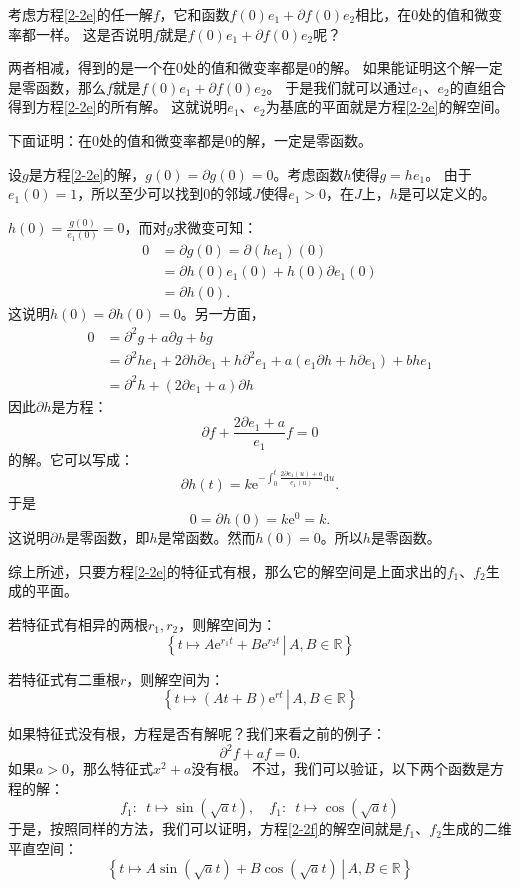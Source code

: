 \documentclass[12pt,UTF8]{ctexbook}
\newcommand{\e}{\mathrm{e}}
\theoremstyle{definition}
\theoremstyle{plain}
\begin{document}
考虑方程\eqref{2-2e}的任一解$f$，它和函数$f(0)e_1 + \partial f(0) e_2$相比，在$0$处的值和微变率都一样。
这是否说明$f$就是$f(0)e_1 + \partial f(0) e_2$呢？

两者相减，得到的是一个在$0$处的值和微变率都是$0$的解。
如果能证明这个解一定是零函数，那么$f$就是$f(0)e_1 + \partial f(0) e_2$。
于是我们就可以通过$e_1$、$e_2$的直组合得到方程\eqref{2-2e}的所有解。
这就说明$e_1$、$e_2$为基底的平面就是方程\eqref{2-2e}的解空间。

下面证明：在$0$处的值和微变率都是$0$的解，一定是零函数。

设$g$是方程\eqref{2-2e}的解，$g(0) = \partial g(0) = 0$。考虑函数$h$使得$g = he_1$。
由于$e_1(0) = 1$，所以至少可以找到$0$的邻域$J$使得$e_1 > 0$，在$J$上，$h$是可以定义的。

$h(0) = \frac{g(0)}{e_1(0)} = 0$，而对$g$求微变可知：
\begin{align*}
    0 &= \partial g(0) = \partial (he_1) (0) \\
    &= \partial h (0) e_1(0) + h (0) \partial e_1(0) \\
    &= \partial h (0).
\end{align*}
这说明$h(0) = \partial h(0) = 0$。另一方面，
\begin{align*}
    0 &= \partial^2 g + a \partial g + b g \\
    &= \partial^2 h e_1 + 2 \partial h \partial e_1 + h \partial^2 e_1 + a(e_1\partial h + h \partial e_1) + b h e_1 \\
    &= \partial^2 h  + (2 \partial e_1 + a) \partial h
\end{align*}
因此$\partial h$是方程：
$$ \partial f + \frac{2 \partial e_1 + a}{e_1} f = 0 $$
的解。它可以写成：
$$ \partial h (t) = k \e^{-\int_0^t \frac{2 \partial e_1(u) + a}{e_1(u)} \mathrm{d}u}. $$
于是
$$0 = \partial h (0) = k \e^0 = k.$$
这说明$\partial h$是零函数，即$h$是常函数。然而$h(0) = 0$。所以$h$是零函数。

综上所述，只要方程\eqref{2-2e}的特征式有根，那么它的解空间是上面求出的$f_1$、$f_2$生成的平面。

若特征式有相异的两根$r_1, r_2$，则解空间为：
$$ \left\{\left.t \mapsto A\e^{r_1t} + B\e^{r_2t}\,\right|\, A, B \in \mathbb{R}\right\}$$

若特征式有二重根$r$，则解空间为：
$$ \left\{\left.t \mapsto (At + B)\e^{rt}\,\right|\, A, B \in \mathbb{R}\right\}$$

如果特征式没有根，方程是否有解呢？我们来看之前的例子：
\begin{equation}
    \partial^2 f + af = 0. \label{2-2f}
\end{equation}
如果$a>0$，那么特征式$x^2 + a$没有根。
不过，我们可以验证，以下两个函数是方程的解：
$$ f_1: \,\,\, t\mapsto \sin{(\sqrt{a}t)}, \quad f_1: \,\,\, t\mapsto \cos{(\sqrt{a}t)} $$
于是，按照同样的方法，我们可以证明，方程\eqref{2-2f}的解空间就是$f_1$、$f_2$生成的二维平直空间：
$$ \left\{\left.t \mapsto A\sin{(\sqrt{a}t)} + B\cos{(\sqrt{a}t)}\,\right|\, A, B \in \mathbb{R}\right\}$$
\end{document}
